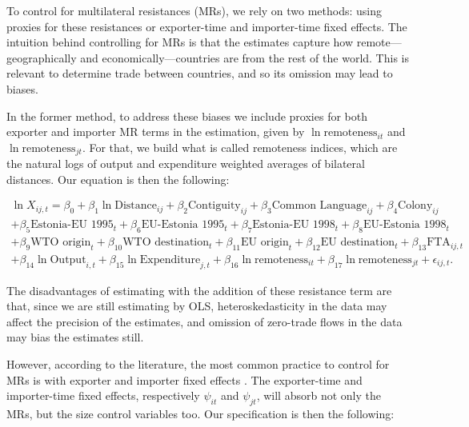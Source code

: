 \documentclass[a4paper,10pt]{article}
\begin{document}
To control for multilateral resistances (MRs), we rely on two methods: using proxies for these resistances or exporter-time and importer-time fixed effects. The intuition behind controlling for MRs is that the estimates capture how remote---geographically and economically---countries are from the rest of the world. This is relevant to determine trade between countries, and so its omission may lead to biases.

In the former method, to address these biases we include proxies for both exporter and importer MR terms in the estimation, given by $\ln \text{remoteness}_{it}$ and $\ln \text{remoteness}_{jt}$. For that, we build what is called remoteness indices, which are the natural logs of output and expenditure weighted averages of bilateral distances. Our equation is then the following:

\vspace{-1cm}
	
	\begin{multline*}
		\ln X_{ij,t}  = \beta_{0} + \beta_{1} \ln \text{Distance}_{ij} + \beta_{2} \text{Contiguity}_{ij} + \beta_{3} \text{Common Language}_{ij} + \beta_{4} \text{Colony}_{ij} \\
		+ \beta_{5} \text{Estonia-EU 1995}_{t} + \beta_{6} \text{EU-Estonia 1995}_{t} + \beta_{7} \text{Estonia-EU 1998}_{t} + \beta_{8} \text{EU-Estonia 1998}_{t} \\
		+ \beta_{9} \text{WTO origin}_{t} + \beta_{10} \text{WTO destination}_{t} + \beta_{11} \text{EU origin}_{t} + \beta_{12} \text{EU destination}_{t} + \beta_{13} \text{FTA}_{ij,t} \\
		+ \beta_{14} \ln \text{Output}_{i,t} + \beta_{15} \ln \text{Expenditure}_{j,t} + \beta_{16} \ln \text{remoteness}_{it} + \beta_{17} \ln \text{remoteness}_{jt} + \epsilon_{ij,t}.
	\end{multline*}

\noindent The disadvantages of estimating with the addition of these resistance term are that, since we are still estimating by OLS, heteroskedasticity in the data may affect the precision of the estimates, and omission of zero-trade flows in the data may bias the estimates still.

However, according to the literature, the most common practice to control for MRs is with exporter and importer fixed effects \citep{feenstra_advanced_2007}. The exporter-time and importer-time fixed effects, respectively $\psi_{it}$ and $\psi_{jt}$, will absorb not only the MRs, but the size control variables too. Our specification is then the following:
\end{document}
